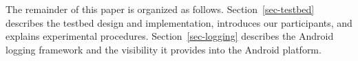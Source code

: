 The remainder of this paper is organized as follows.
Section~\ref{sec-testbed} describes the testbed design and implementation,
introduces our participants, and explains experimental procedures.
Section~\ref{sec-logging} describes the Android logging framework and the
visibility it provides into the Android platform.




